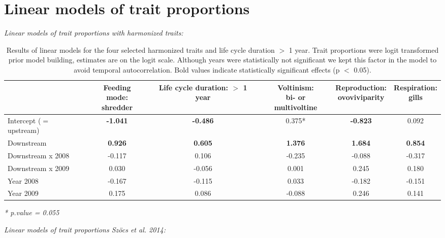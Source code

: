 \documentclass[../Draft_harmonization_paper.tex]{subfiles}
\begin{document}
\section*{Linear models of trait proportions}
\textit{Linear models of trait proportions with harmonized traits:}
\begin{table}[ht]
    \centering
    \caption{Results of linear models for the four selected harmonized traits and life cycle duration $>$ 1 year. Trait proportions were logit transformed prior model building, estimates are on the logit scale. Although years were statistically not significant we kept this factor in the model to avoid temporal autocorrelation. Bold values indicate statistically significant effects (p $<$ 0.05).}
    \label{stab:linear_models_new}
    \begin{tabular}{l|ccccc}
    \toprule[.1em]
    & \specialcell{Feeding mode:\\ shredder} & \specialcell{Life cycle duration:\\ $>$ 1 year} & \specialcell{Voltinism:\\ bi- or multivoltine} & \specialcell{Reproduction:\\ ovoviviparity} & \specialcell{Respiration:\\ gills} \\ 
    \toprule[.1em]
    Intercept ($=$ upstream) & \textbf{-1.041} & \textbf{-0.486} & 0.375* & \textbf{-0.823} & 0.092\\ 
    Downstream & \textbf{0.926} & \textbf{0.605} & \textbf{1.376} & \textbf{1.684} & \textbf{0.854}\\ 
    Downstream x 2008 & -0.117 & 0.106 & -0.235 & -0.088 & -0.317\\ 
    Downstream x 2009 & 0.030 & -0.056 & 0.001 & 0.245 & 0.180\\ 
    Year 2008 & -0.167 & -0.115 & 0.033 & -0.182 & -0.151\\ 
    Year 2009 & 0.175 & 0.086 & -0.088 & 0.246 & 0.141\\ 
    \bottomrule
    \end{tabular}
    \textit{* p.value = 0.055}
\end{table}
\newline
\newline
\newline
\textit{Linear models of trait proportions Szöcs et al. 2014:}
\end{document}
